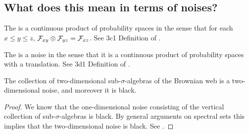 {\subsection{What does this mean in terms of noises?}

\begin{theorem}
  The \brownianwebnoise{}
  is a continuous product of probability spaces in the sense that
  for each $x \le y \le z$, $\mathcal{F}_{x y} \otimes \mathcal{F}_{y z} =
  \mathcal{F}_{x z}$.
  See 3c1 Definition of
  \cite{tsirelson-nonclassical-stochastic-flows}.
\end{theorem}

\begin{theorem}
  The \brownianwebnoise{} is a noise in the sense that it is a
  continuous product of probability spaces with a translation.
  See 3d1 Definition of
  \cite{tsirelson-nonclassical-stochastic-flows}.
\end{theorem}


\begin{theorem}
  The collection of two-dimensional sub-$\sigma$-algebras of the
  Brownian web is a two-dimensional noise, and moreover it is black.
\end{theorem}

\begin{proof}
  We know that the one-dimensional noise consisting of the vertical
  collection of sub-$\sigma$-algebras is black.  By general arguments
  on spectral sets this implies that the two-dimensional noise is
  black.  See \cite{tsirelson-classicality-blackness-spectrum}.
\end{proof}

}
